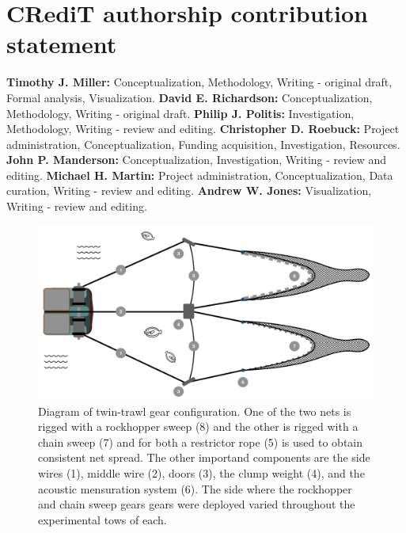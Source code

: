\documentclass[
  12pt,
]{article}
\newlength{\cslhangindent}
\newlength{\cslentryspacingunit} %
\newenvironment{CSLReferences}[2] %
 {%
  \setlength{\parindent}{0pt}
  \ifodd #1
  \let\oldpar\par
  \def\par{\hangindent=\cslhangindent\oldpar}
  \fi
  \setlength{\parskip}{#2\cslentryspacingunit}
 }%
 {}
\begin{document}
\hypertarget{credit-authorship-contribution-statement}{%
\section*{CRediT authorship contribution
statement}\label{credit-authorship-contribution-statement}}

\textbf{Timothy J. Miller:} Conceptualization, Methodology, Writing -
original draft, Formal analysis, Visualization. \textbf{David E.
Richardson:} Conceptualization, Methodology, Writing - original draft.
\textbf{Philip J. Politis:} Investigation, Methodology, Writing - review
and editing. \textbf{Christopher D. Roebuck:} Project administration,
Conceptualization, Funding acquisition, Investigation, Resources.
\textbf{John P. Manderson:} Conceptualization, Investigation, Writing -
review and editing. \textbf{Michael H. Martin:} Project administration,
Conceptualization, Data curation, Writing - review and editing.
\textbf{Andrew W. Jones:} Visualization, Writing - review and editing.

\pagebreak



\hypertarget{refs}{}
\begin{CSLReferences}{0}{0}
\end{CSLReferences}

\pagebreak

\begin{figure}
\caption{Diagram of twin-trawl gear configuration. One of the two nets is rigged with a rockhopper sweep (8) and the other is rigged with a chain sweep (7) and for both a restrictor rope (5) is used to obtain consistent net spread. The other importand components are the side wires (1), middle wire (2), doors (3), the clump weight (4), and the acoustic mensuration system (6).  The side where the rockhopper and chain sweep gears gears were deployed varied throughout the experimental tows of each.}\label{twin_trawl_diagram}
\begin{center}
\includegraphics[width = \textwidth]{twin_trawl_diagram.pdf}
\end{center}
\end{figure}
\end{document}
